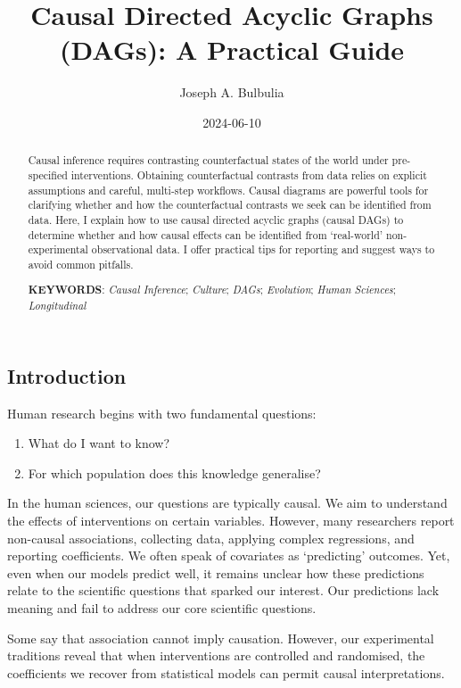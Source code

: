 \documentclass[
  single column]{article}
\title{Causal Directed Acyclic Graphs (DAGs): A Practical Guide}
\author{Joseph A. Bulbulia}
\affil{%
             \small{     Victoria University of Wellington, New Zealand
          ORCID \textcolor[HTML]{A6CE39}{\aiOrcid} ~0000-0002-5861-2056 }
              }
\date{2024-06-10}
\providecommand{\tightlist}{%
  \setlength{\itemsep}{0pt}\setlength{\parskip}{0pt}}\usepackage{longtable,booktabs,array}
\begin{document}
\maketitle
\begin{abstract}
Causal inference requires contrasting counterfactual states of the world
under pre-specified interventions. Obtaining counterfactual contrasts
from data relies on explicit assumptions and careful, multi-step
workflows. Causal diagrams are powerful tools for clarifying whether and
how the counterfactual contrasts we seek can be identified from data.
Here, I explain how to use causal directed acyclic graphs (causal DAGs)
to determine whether and how causal effects can be identified from
`real-world' non-experimental observational data. I offer practical tips
for reporting and suggest ways to avoid common pitfalls.

\textbf{KEYWORDS}: \emph{Causal Inference}; \emph{Culture}; \emph{DAGs};
\emph{Evolution}; \emph{Human Sciences}; \emph{Longitudinal}
\end{abstract}

\subsection{Introduction}\label{id-sec-introduction}

Human research begins with two fundamental questions:

\begin{enumerate}
\def\labelenumi{\arabic{enumi}.}
\tightlist
\item
  What do I want to know?
\item
  For which population does this knowledge generalise?
\end{enumerate}

In the human sciences, our questions are typically causal. We aim to
understand the effects of interventions on certain variables. However,
many researchers report non-causal associations, collecting data,
applying complex regressions, and reporting coefficients. We often speak
of covariates as `predicting' outcomes. Yet, even when our models
predict well, it remains unclear how these predictions relate to the
scientific questions that sparked our interest. Our predictions lack
meaning and fail to address our core scientific questions.

Some say that association cannot imply causation. However, our
experimental traditions reveal that when interventions are controlled
and randomised, the coefficients we recover from statistical models can
permit causal interpretations.
\end{document}
